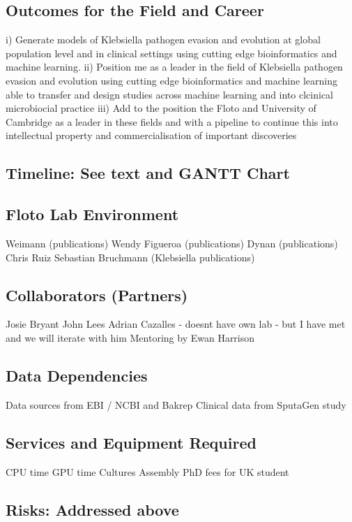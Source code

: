 \subsection*{Outcomes for the Field and Career}
i)  Generate models of Klebsiella pathogen evasion and evolution at global population level and in clinical settings using cutting edge bioinformatics and machine learning. 
ii)  Position me as a leader in the field of Klebsiella pathogen evasion and evolution using cutting edge bioinformatics and machine learning able to transfer and design studies across machine learning and into clcinical microbiocial practice
iii)  Add to the position the Floto and University of Cambridge as a leader in these fields and with a pipeline to continue this into intellectual property and commercialisation of important discoveries


\subsection*{Timeline:  See text and GANTT Chart}

\subsection*{Floto Lab Environment}
Weimann (publications)
Wendy Figueroa (publications)
Dynan (publications)
Chris Ruiz
Sebastian Bruchmann (Klebsiella publications)

\subsection*{Collaborators (Partners)}
Josie Bryant
John Lees
Adrian Cazalles - doesnt have own lab - but I have met and we will iterate with him
Mentoring by Ewan Harrison

\subsection*{Data Dependencies}
Data sources from EBI / NCBI and Bakrep
Clinical data from SputaGen study

\subsection*{Services and Equipment Required}
CPU time
GPU time
Cultures
Assembly
PhD fees for UK student

\subsection*{Risks:  Addressed above}

